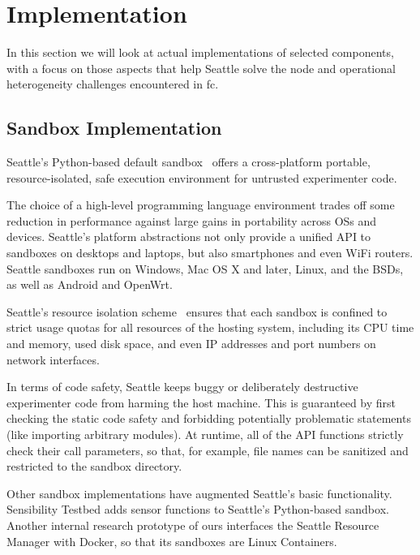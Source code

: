 \section{Implementation}

In this section we will look at actual implementations of
selected components, with a focus on those aspects that help
Seattle solve the node and operational heterogeneity
challenges encountered in \gls{fc}.

\subsection{Sandbox Implementation}

Seattle's Python-based default sandbox~\cite{RepySandbox}
offers a cross-platform portable, resource-isolated,
safe execution environment for untrusted experimenter code.

The choice of a high-level programming language environment trades
off some reduction in performance against large gains in portability
across \glspl{OS} and devices. Seattle's platform abstractions not only
provide a unified \gls{API} to sandboxes on desktops and laptops,
but also smartphones and even WiFi routers. Seattle sandboxes
run on Windows, Mac OS X and later, Linux, and the \glspl{BSD}, as
well as Android and OpenWrt.

Seattle's resource isolation scheme~\cite{li2015fence} ensures
that each sandbox is confined to strict usage quotas for all
resources of the hosting system, including its \gls{CPU} time and
memory, used disk space, and even \gls{IP} addresses and port numbers
on network interfaces.

In terms of code safety, Seattle keeps buggy or deliberately destructive
experimenter code from harming the host machine. This is guaranteed
by first checking the static code safety and forbidding potentially
problematic statements (like importing arbitrary modules). At runtime,
all of the \gls{API} functions strictly check their call parameters,
so that, for example, file names can be sanitized and restricted to the
sandbox directory.

Other sandbox implementations have augmented Seattle's basic functionality.
Sensibility Testbed adds sensor functions to Seattle's Python-based
sandbox. Another internal research prototype of ours interfaces the
Seattle Resource Manager with Docker, so that its sandboxes are
Linux Containers.



